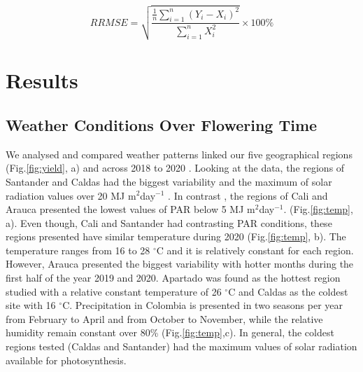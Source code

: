 \documentclass[gene,journal,article,submit,moreauthors,pdftex]{Definitions/mdpi}
\begin{document}
\begin{equation}
RRMSE= \sqrt{\frac{\frac{1}{n}  \sum_{i=1}^{n} (Y_{i}-X_{i})^{2}}{\sum_{i=1}^{n} X_{i}^{2} } } \times 100\% 
\label{equ:RRMSE}
\end{equation}



\section{Results}

\subsection{Weather Conditions Over Flowering Time }
We analysed and compared weather patterns linked our five geographical regions (Fig.\ref{fig:yield}, a) and across 2018 to 2020 . Looking at the data, the regions of Santander and Caldas had the biggest variability and the maximum of solar radiation values over 20 MJ m$^{2}$day$^{-1}$ . In contrast , the regions of Cali and Arauca presented the lowest values of PAR below 5 MJ m$^{2}$day$^{-1}$. (Fig.\ref{fig:temp}, a).  Even though, Cali and Santander had contrasting PAR conditions, these regions presented  have similar temperature during 2020 (Fig.\ref{fig:temp}, b). The temperature ranges from 16 to 28 $^\circ$C and it is relatively constant for each region. However, Arauca presented the biggest variability with hotter months during the first half of the year 2019 and 2020.  Apartado was found as the hottest region studied with a relative constant temperature of 26 $^\circ$C and Caldas as the coldest site with 16 $^\circ$C.  Precipitation in Colombia is presented in two seasons per year from February to April and from October to November, while the relative humidity remain constant over 80\% (Fig.\ref{fig:temp},c). In general, the coldest regions tested (Caldas and Santander) had the maximum values of solar radiation available for photosynthesis. 
\end{document}
